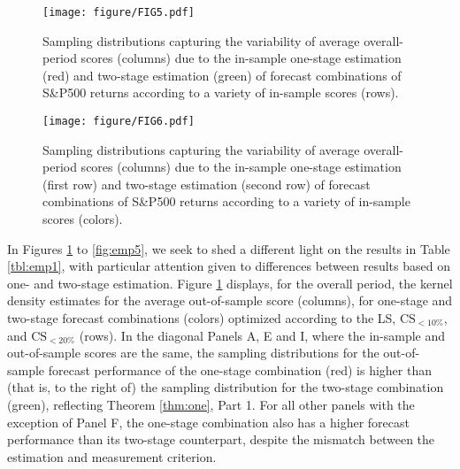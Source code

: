 \documentclass[12pt]{article}
\theoremstyle{definition}
\theoremstyle{remark}
\begin{document}
\begin{figure}[t]
\texttt{[image: figure/FIG5.pdf]}
\caption{Sampling distributions capturing the variability of average overall-period scores (columns) due to the in-sample one-stage estimation (red) and two-stage estimation (green) of forecast combinations of S\&P500 returns according to a variety of in-sample scores (rows).}
\label{fig:emp2}
\end{figure}

\begin{figure}[t]
\texttt{[image: figure/FIG6.pdf]}
\caption{Sampling distributions capturing the variability of average overall-period scores (columns) due to the in-sample one-stage estimation (first row) and two-stage estimation (second row) of forecast combinations of S\&P500 returns according to a variety of in-sample scores (colors).}
\label{fig:emp3}
\end{figure}

In Figures \ref{fig:emp2} to \ref{fig:emp5}, we seek to shed a different light on the results in Table \ref{tbl:emp1}, with particular attention given to differences between results based on one- and two-stage estimation. Figure \ref{fig:emp2} displays, for the overall period, the kernel density estimates for the average out-of-sample score (columns), for one-stage and two-stage forecast combinations (colors) optimized according to the LS, $\mathrm{CS}_{<10\%}$, and $\mathrm{CS}_{<20\%}$ (rows). In the diagonal Panels A, E and I, where the in-sample and out-of-sample scores are the same, the sampling distributions for the out-of-sample forecast performance of the one-stage combination (red) is higher than (that is, to the right of) the sampling distribution for the two-stage combination (green), reflecting Theorem \ref{thm:one}, Part 1. For all other panels with the exception of Panel F, the one-stage combination also has a higher forecast performance than its two-stage counterpart, despite the mismatch between the estimation and measurement criterion.
\end{document}
